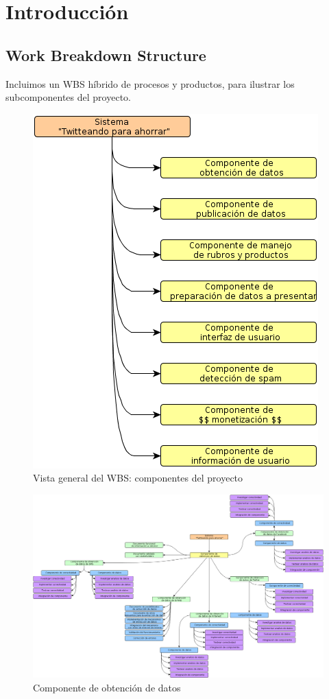 \documentclass[10pt, a4paper]{article}
\newcommand{\escaladefault}{0.85}
\begin{document}
\section{Introducción}

\subsection{Work Breakdown Structure} 

Incluimos un WBS híbrido de procesos y productos, para ilustrar los subcomponentes del proyecto.

\begin{figure}[H]
\centering
\includegraphics[scale=\escaladefault]{graficos/wbs/primera_capa.png}
\caption{Vista general del WBS: componentes del proyecto}
\end{figure}


\begin{figure}[H]
\centering
\includegraphics[scale=\escaladefault]{graficos/wbs/comp_obtencion_datos.png}
\caption{Componente de obtención de datos}
\end{figure}
\end{document}
